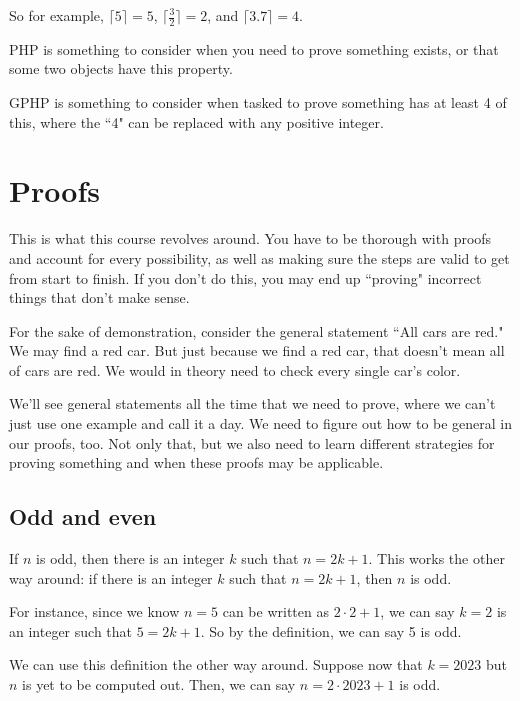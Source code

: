 \documentclass[11pt]{scrartcl}
\begin{document}
So for example, $\lceil 5 \rceil = 5$, $\lceil \frac{3}{2} \rceil = 2$, and $\lceil 3.7 \rceil = 4$.

\begin{advice}
PHP is something to consider when you need to prove something exists, or that some two objects have this property.

GPHP is something to consider when tasked to prove something has at least 4 of this, where the ``4" can be replaced with any positive integer.
\end{advice}



\section{Proofs}

This is what this course revolves around. You have to be thorough with proofs and account for every possibility, as well as making sure the steps are valid to get from start to finish. If you don't do this, you may end up ``proving" incorrect things that don't make sense.

For the sake of demonstration, consider the general statement ``All cars are red." We may find a red car. But just because we find a red car, that doesn't mean all of cars are red. We would in theory need to check every single car's color.

We'll see general statements all the time that we need to prove, where we can't just use one example and call it a day. We need to figure out how to be general in our proofs, too. Not only that, but we also need to learn different strategies for proving something and when these proofs may be applicable.

\subsection{Odd and even}

\begin{definition}
If $n$ is odd, then there is an integer $k$ such that $n = 2k+1$. This works the other way around: if there is an integer $k$ such that $n = 2k+1$, then $n$ is odd.
\end{definition}
For instance, since we know $n = 5$ can be written as $2 \cdot 2 + 1$, we can say $k = 2$ is an integer such that $5 = 2k + 1$. So by the definition, we can say 5 is odd.

We can use this definition the other way around. Suppose now that $k = 2023$ but $n$ is yet to be computed out. Then, we can say $n = 2 \cdot 2023 + 1$ is odd.
\end{document}
